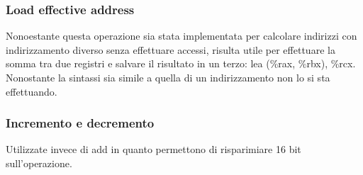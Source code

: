 \subsubsection{Load effective address}
Nonoestante questa operazione sia stata implementata per calcolare indirizzi con indirizzamento diverso senza effettuare accessi, risulta utile per effettuare la somma
tra due registri e salvare il risultato in un terzo: lea (\%rax, \%rbx), \%rcx. Nonostante la sintassi sia simile a quella di un indirizzamento non lo si sta 
effettuando.
\subsubsection{Incremento e decremento}
Utilizzate invece di add in quanto permettono di risparimiare 16 bit sull'operazione.  